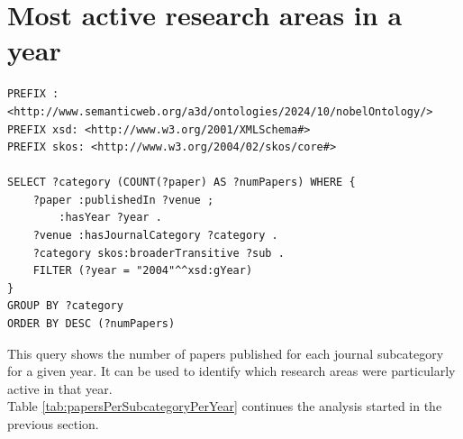 \documentclass{article}
\begin{document}
\section{Most active research areas in a year} \label{moreActiveResearchAreas}
\begin{lstlisting}
PREFIX : <http://www.semanticweb.org/a3d/ontologies/2024/10/nobelOntology/>
PREFIX xsd: <http://www.w3.org/2001/XMLSchema#>
PREFIX skos: <http://www.w3.org/2004/02/skos/core#>

SELECT ?category (COUNT(?paper) AS ?numPapers) WHERE {
    ?paper :publishedIn ?venue ;
        :hasYear ?year .
    ?venue :hasJournalCategory ?category .
    ?category skos:broaderTransitive ?sub .
    FILTER (?year = "2004"^^xsd:gYear)
}
GROUP BY ?category
ORDER BY DESC (?numPapers)
\end{lstlisting}

\vspace{1em}

This query shows the number of papers published for each journal subcategory for a given year.
It can be used to identify which research areas were particularly active in that year.\\
Table \ref{tab:papersPerSubcategoryPerYear} continues the analysis started in the previous section.
\end{document}
